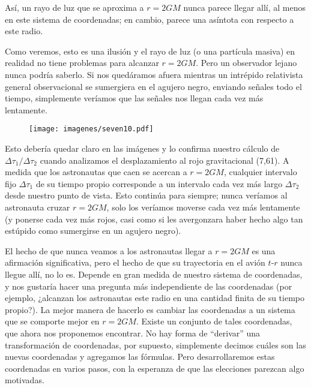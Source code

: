 \documentclass[11pt,b5paper,openany,twoside]{book}
\begin{document}
\noindent
Así, un rayo de luz que se aproxima a $r=2GM$ nunca parece llegar allí, al menos en este sistema de coordenadas; en cambio, parece una asíntota con respecto a este radio.

Como veremos, esto es una ilusión y el rayo de luz (o una partícula masiva) en realidad no tiene problemas para alcanzar $r=2GM$.
Pero un observador lejano nunca podría saberlo.
Si nos quedáramos afuera mientras un intrépido relativista general observacional se sumergiera en el agujero negro, enviando señales todo el tiempo, simplemente veríamos que las señales nos llegan cada vez más lentamente.

\begin{figure}[h]
\centering
\texttt{[image: imagenes/seven10.pdf]}
\end{figure}
Esto debería quedar claro en las imágenes y lo confirma nuestro cálculo de $\Delta\tau_1/\Delta\tau_2$ cuando analizamos el desplazamiento al rojo gravitacional (7,61).
A medida que los astronautas que caen se acercan a $r=2GM$, cualquier intervalo fijo $\Delta\tau_1$ de su tiempo propio corresponde a un intervalo cada vez más largo $\Delta\tau_2$ desde nuestro punto de vista.
Esto continúa para siempre; nunca veríamos al astronauta cruzar $r=2GM$, solo los veríamos moverse cada vez más lentamente (y ponerse cada vez más rojos, casi como si les avergonzara haber hecho algo tan estúpido como sumergirse en un agujero negro).

El hecho de que nunca veamos a los astronautas llegar a $r=2GM$ es una afirmación significativa, pero el hecho de que su trayectoria en el avión $t$-$r$ nunca llegue allí, no lo es.
Depende en gran medida de nuestro sistema de coordenadas, y nos gustaría hacer una pregunta más independiente de las coordenadas (por ejemplo, ¿alcanzan los astronautas este radio en una cantidad finita de su tiempo propio?).
La mejor manera de hacerlo es cambiar las coordenadas a un sistema que se comporte mejor en $r=2GM$.
Existe un conjunto de tales coordenadas, que ahora nos proponemos encontrar.
No hay forma de ``derivar'' una transformación de coordenadas, por supuesto, simplemente decimos cuáles son las nuevas coordenadas y agregamos las fórmulas.
Pero desarrollaremos estas coordenadas en varios pasos, con la esperanza de que las elecciones parezcan algo motivadas.
\end{document}
